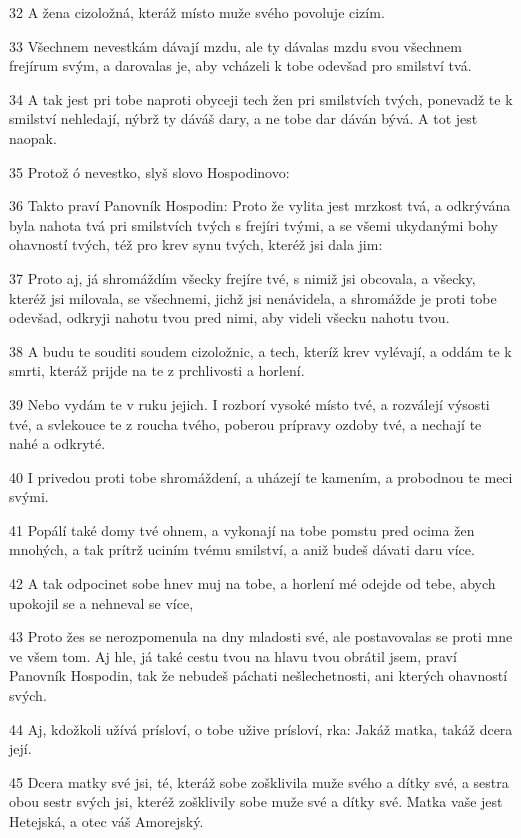 \par 32 A žena cizoložná, kteráž místo muže svého povoluje cizím.
\par 33 Všechnem nevestkám dávají mzdu, ale ty dávalas mzdu svou všechnem frejírum svým, a darovalas je, aby vcházeli k tobe odevšad pro smilství tvá.
\par 34 A tak jest pri tobe naproti obyceji tech žen pri smilstvích tvých, ponevadž te k smilství nehledají, nýbrž ty dáváš dary, a ne tobe dar dáván bývá. A tot jest naopak.
\par 35 Protož ó nevestko, slyš slovo Hospodinovo:
\par 36 Takto praví Panovník Hospodin: Proto že vylita jest mrzkost tvá, a odkrývána byla nahota tvá pri smilstvích tvých s frejíri tvými, a se všemi ukydanými bohy ohavností tvých, též pro krev synu tvých, kteréž jsi dala jim:
\par 37 Proto aj, já shromáždím všecky frejíre tvé, s nimiž jsi obcovala, a všecky, kteréž jsi milovala, se všechnemi, jichž jsi nenávidela, a shromážde je proti tobe odevšad, odkryji nahotu tvou pred nimi, aby videli všecku nahotu tvou.
\par 38 A budu te souditi soudem cizoložnic, a tech, kteríž krev vylévají, a oddám te k smrti, kteráž prijde na te z prchlivosti a horlení.
\par 39 Nebo vydám te v ruku jejich. I rozborí vysoké místo tvé, a rozválejí výsosti tvé, a svlekouce te z roucha tvého, poberou prípravy ozdoby tvé, a nechají te nahé a odkryté.
\par 40 I privedou proti tobe shromáždení, a uházejí te kamením, a probodnou te meci svými.
\par 41 Popálí také domy tvé ohnem, a vykonají na tobe pomstu pred ocima žen mnohých, a tak prítrž uciním tvému smilství, a aniž budeš dávati daru více.
\par 42 A tak odpocinet sobe hnev muj na tobe, a horlení mé odejde od tebe, abych upokojil se a nehneval se více,
\par 43 Proto žes se nerozpomenula na dny mladosti své, ale postavovalas se proti mne ve všem tom. Aj hle, já také cestu tvou na hlavu tvou obrátil jsem, praví Panovník Hospodin, tak že nebudeš páchati nešlechetnosti, ani kterých ohavností svých.
\par 44 Aj, kdožkoli užívá prísloví, o tobe užive prísloví, rka: Jakáž matka, takáž dcera její.
\par 45 Dcera matky své jsi, té, kteráž sobe zošklivila muže svého a dítky své, a sestra obou sestr svých jsi, kteréž zošklivily sobe muže své a dítky své. Matka vaše jest Hetejská, a otec váš Amorejský.
